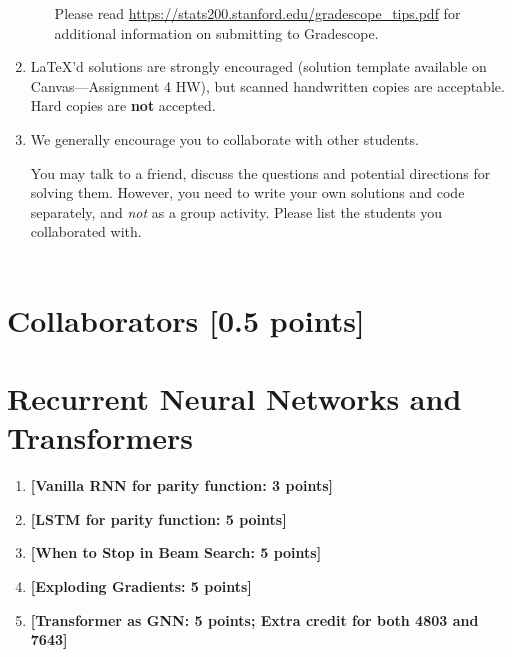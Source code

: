 \documentclass[11pt,english]{article}
\begin{document}
\begin{enumerate}
\begin{itemize}
               Please read \url{https://stats200.stanford.edu/gradescope_tips.pdf} for additional information on submitting to Gradescope.
     \end{itemize}

\item
    \LaTeX'd  solutions are strongly encouraged (solution template
     available on Canvas---Assignment 4 HW),
     but scanned handwritten copies are acceptable.
     Hard copies are \textbf{not} accepted.


\item We generally encourage you to collaborate with other students.

You may talk to a friend,
discuss the questions and potential directions for solving them. However, you need to write
your own solutions and code separately, and \emph{not} as a group activity.
Please list the students you collaborated with. \\ \\

\end{enumerate}



\section{Collaborators [0.5 points]}




\section{Recurrent Neural Networks and Transformers}
\begin{enumerate}[start]

\item
\textbf{[Vanilla RNN for parity function: 3 points]}


\item
\textbf{[LSTM for parity function: 5 points]}


\item
\textbf{[When to Stop in Beam Search: 5 points]}


\item
\textbf{[Exploding Gradients: 5 points]}


\item
\textbf{[Transformer as GNN: 5 points; Extra credit for both 4803 and 7643]}


\end{enumerate}
\end{document}
